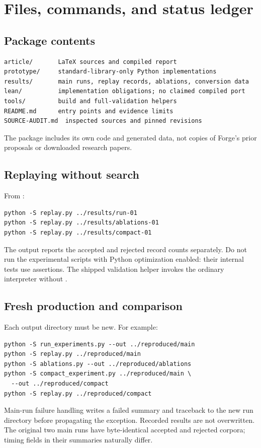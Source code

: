 \section{Files, commands, and status ledger}
\subsection{Package contents}
\begin{lstlisting}
article/       LaTeX sources and compiled report
prototype/     standard-library-only Python implementations
results/       main runs, replay records, ablations, conversion data
lean/          implementation obligations; no claimed compiled port
tools/         build and full-validation helpers
README.md      entry points and evidence limits
SOURCE-AUDIT.md  inspected sources and pinned revisions
\end{lstlisting}
The package includes its own code and generated data, not copies of Forge's prior proposals or downloaded research papers.

\subsection{Replaying without search}
From :
\begin{lstlisting}
python -S replay.py ../results/run-01
python -S replay.py ../results/ablations-01
python -S replay.py ../results/compact-01
\end{lstlisting}
The output reports the accepted and rejected record counts separately. Do not run the experimental scripts with Python optimization enabled: their internal tests use assertions. The shipped validation helper invokes the ordinary interpreter without .

\subsection{Fresh production and comparison}
Each output directory must be new. For example:
\begin{lstlisting}
python -S run_experiments.py --out ../reproduced/main
python -S replay.py ../reproduced/main
python -S ablations.py --out ../reproduced/ablations
python -S compact_experiment.py ../reproduced/main \
  --out ../reproduced/compact
python -S replay.py ../reproduced/compact
\end{lstlisting}
Main-run failure handling writes a failed summary and traceback to the new run directory before propagating the exception. Recorded results are not overwritten. The original two main runs have byte-identical accepted and rejected corpora; timing fields in their summaries naturally differ.

